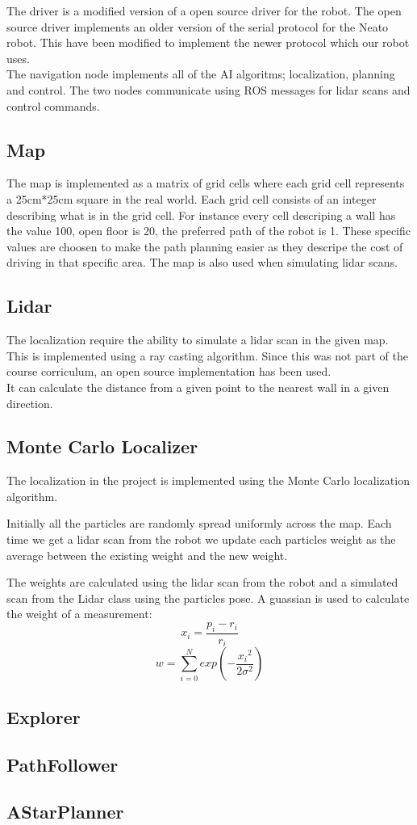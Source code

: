 The driver is a modified version of a open source driver for the robot. 
The open source driver implements an older version of the serial protocol for the Neato robot.
This have been modified to implement the newer protocol which our robot uses.\\

The navigation node implements all of the AI algoritms; localization, planning and control.
The two nodes communicate using ROS messages for lidar scans and control commands. 

\subsection{Map}
The map is implemented as a matrix of grid cells where each grid cell represents a 25cm*25cm square in the real world.
Each grid cell consists of an integer describing what is in the grid cell. For instance every cell descriping a wall has the value 100, open floor is 20, the preferred path of the robot is 1.
These specific values are choosen to make the path planning easier as they descripe the cost of driving in that specific area.
The map is also used when simulating lidar scans.

\subsection{Lidar}
The localization require the ability to simulate a lidar scan in the given map.
This is implemented using a ray casting algorithm.
Since this was not part of the course corriculum, an open source implementation has been used.\\

It can calculate the distance from a given point to the nearest wall in a given direction.

\subsection{Monte Carlo Localizer}
The localization in the project is implemented using the Monte Carlo localization algorithm.

Initially all the particles are randomly spread uniformly across the map.
Each time we get a lidar scan from the robot we update each particles weight as the average between the existing weight and the new weight.

The weights are calculated using the lidar scan from the robot and a simulated scan from the Lidar class using the particles pose.
A guassian is used to calculate the weight of a measurement:
$$x_i = \frac{p_i - r_i}{r_i}$$
$$w = \sum_{i=0}^N exp\left(-\frac{{x_i}^2}{2\sigma^2}\right)$$

\subsection{Explorer}
\subsection{PathFollower}
\subsection{AStarPlanner}

